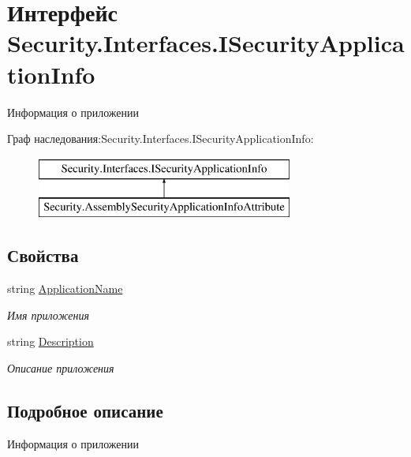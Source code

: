 \hypertarget{interface_security_1_1_interfaces_1_1_i_security_application_info}{}\section{Интерфейс Security.\+Interfaces.\+I\+Security\+Application\+Info}
\label{interface_security_1_1_interfaces_1_1_i_security_application_info}


Информация о приложении  


Граф наследования\+:Security.\+Interfaces.\+I\+Security\+Application\+Info\+:\begin{figure}[H]
\begin{center}
\leavevmode
\includegraphics[height=2.000000cm]{d4/dee/interface_security_1_1_interfaces_1_1_i_security_application_info}
\end{center}
\end{figure}
\subsection*{Свойства}
\begin{DoxyCompactItemize}
\item 
string \hyperlink{interface_security_1_1_interfaces_1_1_i_security_application_info_ab9394fd84609544b7092b79b4c7232f3}{Application\+Name}
\begin{DoxyCompactList}\small\item\em Имя приложения \end{DoxyCompactList}\item 
string \hyperlink{interface_security_1_1_interfaces_1_1_i_security_application_info_af14899810af00e34047c224505c45c03}{Description}
\begin{DoxyCompactList}\small\item\em Описание приложения \end{DoxyCompactList}\end{DoxyCompactItemize}


\subsection{Подробное описание}
Информация о приложении 



